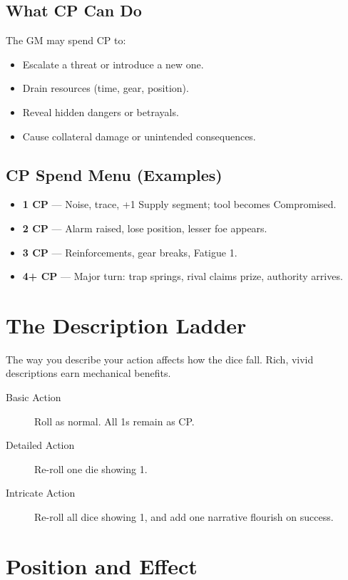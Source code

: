 \subsection*{What CP Can Do}

The GM may spend CP to:
\begin{itemize}
  \item Escalate a threat or introduce a new one.
  \item Drain resources (time, gear, position).
  \item Reveal hidden dangers or betrayals.
  \item Cause collateral damage or unintended consequences.
\end{itemize}

\subsection*{CP Spend Menu (Examples)}

\begin{itemize}
  \item \textbf{1 CP} — Noise, trace, +1 Supply segment; tool becomes Compromised.
  \item \textbf{2 CP} — Alarm raised, lose position, lesser foe appears.
  \item \textbf{3 CP} — Reinforcements, gear breaks, Fatigue 1.
  \item \textbf{4+ CP} — Major turn: trap springs, rival claims prize, authority arrives.
\end{itemize}

\section{The Description Ladder}

The way you describe your action affects how the dice fall. Rich, vivid descriptions earn mechanical benefits.

\begin{description}
  \item[Basic Action] Roll as normal. All 1s remain as CP.
  \item[Detailed Action] Re-roll one die showing 1.
  \item[Intricate Action] Re-roll all dice showing 1, and add one narrative flourish on success.
\end{description}

\section{Position and Effect}

